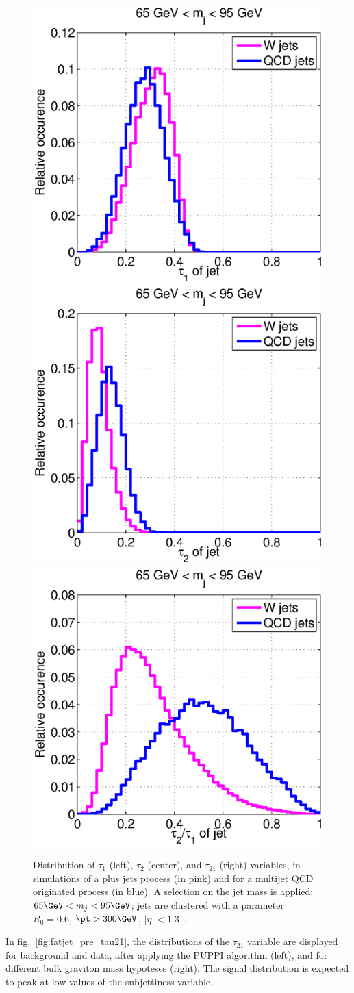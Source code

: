 \begin{figure}[!htb]
  \begin{center}
    \includegraphics[width=.33\textwidth]{figures/tau1w.eps}
    \includegraphics[width=.33\textwidth]{figures/tau2w.eps}
    \includegraphics[width=.33\textwidth]{figures/tau2tau1w.eps}
  \end{center}
  \caption{Distribution of $\tau_1$ (left), $\tau_2$ (center), and $\tau_{21}$ (right) variables, in simulations of a \W plus jets process (in pink) and for a multijet QCD originated process (in blue). A selection on the jet mass is applied: $65 \GeV < m_j < 95 \GeV$; jets are clustered with a parameter $R_0 = 0.6$, $\pt > 300 \GeV$, $|\eta|<1.3$~\cite{Thaler2011}.}
  \label{fig:tau21_original_paper}
\end{figure} 

\noindent In fig.~\ref{fig:fatjet_pre_tau21}, the distributions of the $\tau_{21}$ variable are displayed for background and data, after applying the PUPPI algorithm (left), and for different bulk graviton mass hypoteses (right). The signal distribution is expected to peak at low values of the subjettiness variable.

